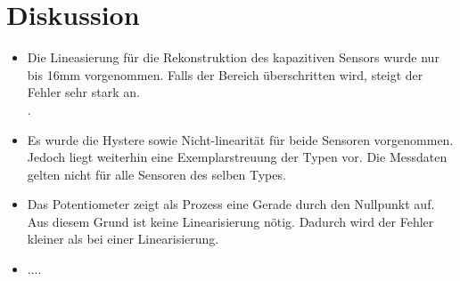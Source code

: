\section{Diskussion}
\begin{itemize}
    \item Die Lineasierung für die Rekonstruktion des kapazitiven Sensors wurde nur bis 16mm vorgenommen. Falls der Bereich überschritten wird, steigt der Fehler sehr stark an.\\.
    \item Es wurde die Hystere sowie Nicht-linearität für beide Sensoren vorgenommen. Jedoch liegt weiterhin eine Exemplarstreuung der Typen vor. Die Messdaten gelten nicht für alle Sensoren des selben Types.
    \item Das Potentiometer zeigt als Prozess eine Gerade durch den Nullpunkt auf. Aus diesem Grund ist keine Linearisierung nötig. Dadurch wird der Fehler kleiner als bei einer Linearisierung. 
    \item ....
\end{itemize}
      
\clearpage